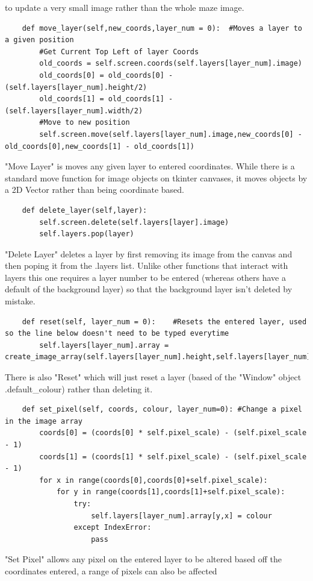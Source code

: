 \documentclass{article}
\begin{document}
to update a very small image rather than the whole maze image. 
\begin{lstlisting}
    def move_layer(self,new_coords,layer_num = 0):  #Moves a layer to a given position
        #Get Current Top Left of layer Coords
        old_coords = self.screen.coords(self.layers[layer_num].image)
        old_coords[0] = old_coords[0] - (self.layers[layer_num].height/2)
        old_coords[1] = old_coords[1] - (self.layers[layer_num].width/2)
        #Move to new position
        self.screen.move(self.layers[layer_num].image,new_coords[0] - old_coords[0],new_coords[1] - old_coords[1])
\end{lstlisting}
"Move Layer" is moves any given layer to entered coordinates. While there is a standard move function for image objects on
tkinter canvases, it moves objects by a 2D Vector rather than being coordinate based.
\begin{lstlisting}
    def delete_layer(self,layer):
        self.screen.delete(self.layers[layer].image)
        self.layers.pop(layer) 
\end{lstlisting}
"Delete Layer" deletes a layer by first removing its image from the canvas and then poping it from the .layers list. Unlike other functions
that interact with layers this one requires a layer number to be entered (whereas others have a default of the background layer) so that
the background layer isn't deleted by mistake. 
\begin{lstlisting}
    def reset(self, layer_num = 0):    #Resets the entered layer, used so the line below doesn't need to be typed everytime
        self.layers[layer_num].array = create_image_array(self.layers[layer_num].height,self.layers[layer_num].width,self.layers[layer_num].default_colour)
\end{lstlisting}
There is also "Reset" which will just reset a layer (based of the "Window" object .default\_colour) rather than deleting it.
\begin{lstlisting}
    def set_pixel(self, coords, colour, layer_num=0): #Change a pixel in the image array
        coords[0] = (coords[0] * self.pixel_scale) - (self.pixel_scale - 1)
        coords[1] = (coords[1] * self.pixel_scale) - (self.pixel_scale - 1)
        for x in range(coords[0],coords[0]+self.pixel_scale):
            for y in range(coords[1],coords[1]+self.pixel_scale):
                try:
                    self.layers[layer_num].array[y,x] = colour
                except IndexError:
                    pass   
\end{lstlisting}
"Set Pixel" allows any pixel on the entered layer to be altered based off the coordinates entered, a range of pixels can also be affected 
\end{document}
